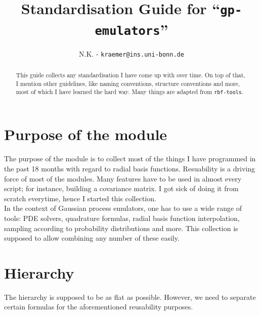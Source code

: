 \documentclass[11pt]{article}
\title{Standardisation Guide for ``\texttt{gp-emulators}''}
\author{N.K. - \texttt{kraemer@ins.uni-bonn.de}}
\begin{document}
\maketitle
\begin{abstract}
This guide collects any standardisation I have come up with over time. On top of that, I mention other guidelines, like naming conventions, structure conventions and more, most of which I have learned the hard way. Many things are adapted from \texttt{rbf-tools}. 
\end{abstract}
\begin{figure}[h]
\centering
\begin{minipage}{0.5\textwidth}
\tableofcontents
\end{minipage}
\end{figure}




\section{Purpose of the module}

The purpose of the module is to collect most of the things I have programmed in the past 18 months with regard to radial basis functions. Resuability is a driving force of most of the modules. Many features have to be used in almost every script; for instance, building a covariance matrix. I got sick of doing it from scratch everytime, hence I started this collection. \\

In the context of Gaussian process emulators, one has to use a wide range of tools: PDE solvers, quadrature formulas, radial basis function interpolation, sampling according to probability distributions and more. This collection is supposed to allow combining any number of these easily. 



\section{Hierarchy}
The hierarchy is supposed to be as flat as possible. However, we need to separate certain formulas for the aforementioned reusability purposes.
\end{document}
